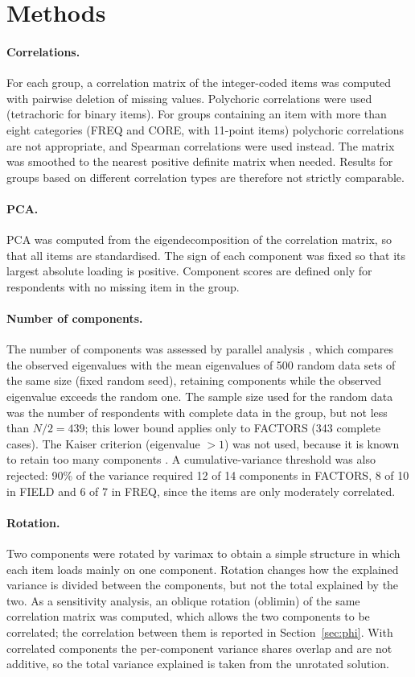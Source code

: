 \documentclass[11pt,a4paper]{article}
\begin{document}
\section{Methods}

\paragraph{Correlations.}
For each group, a correlation matrix of the integer-coded items was computed with pairwise deletion of missing values. Polychoric correlations were used (tetrachoric for binary items). For groups containing an item with more than eight categories (FREQ and CORE, with 11-point items) polychoric correlations are not appropriate, and Spearman correlations were used instead. The matrix was smoothed to the nearest positive definite matrix when needed. Results for groups based on different correlation types are therefore not strictly comparable.

\paragraph{PCA.}
PCA was computed from the eigendecomposition of the correlation matrix, so that all items are standardised. The sign of each component was fixed so that its largest absolute loading is positive. Component scores are defined only for respondents with no missing item in the group.

\paragraph{Number of components.}
The number of components was assessed by parallel analysis \citep{horn1965}, which compares the observed eigenvalues with the mean eigenvalues of 500 random data sets of the same size (fixed random seed), retaining components while the observed eigenvalue exceeds the random one. The sample size used for the random data was the number of respondents with complete data in the group, but not less than $N/2=439$; this lower bound applies only to FACTORS (343 complete cases). The Kaiser criterion (eigenvalue $>1$) was not used, because it is known to retain too many components \citep{zwick1986}. A cumulative-variance threshold was also rejected: 90\% of the variance required 12 of 14 components in FACTORS, 8 of 10 in FIELD and 6 of 7 in FREQ, since the items are only moderately correlated.

\paragraph{Rotation.}
Two components were rotated by varimax to obtain a simple structure in which each item loads mainly on one component. Rotation changes how the explained variance is divided between the components, but not the total explained by the two. As a sensitivity analysis, an oblique rotation (oblimin) of the same correlation matrix was computed, which allows the two components to be correlated; the correlation between them is reported in Section~\ref{sec:phi}. With correlated components the per-component variance shares overlap and are not additive, so the total variance explained is taken from the unrotated solution.
\end{document}
